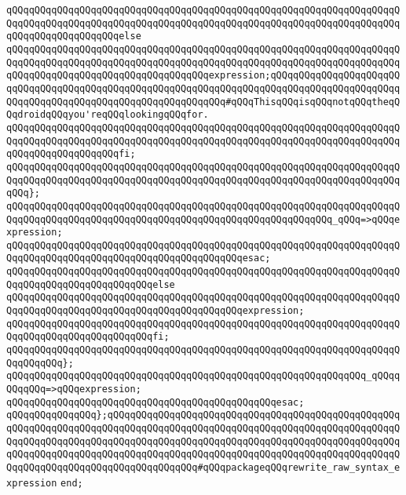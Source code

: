 \newline
\verb|qQQqqQQqqQQqqQQqqQQqqQQqqQQqqQQqqQQqqQQqqQQqqQQqqQQqqQQqqQQqqQQqqQQqqQQqqQQqqQQqqQQqqQQqqQQqqQQqqQQqqQQqqQQqqQQqqQQqqQQqqQQqqQQqqQQqqQQqqQQqqQQqqQQqqQQqqQQqqQQqelse|\newline
\verb|qQQqqQQqqQQqqQQqqQQqqQQqqQQqqQQqqQQqqQQqqQQqqQQqqQQqqQQqqQQqqQQqqQQqqQQqqQQqqQQqqQQqqQQqqQQqqQQqqQQqqQQqqQQqqQQqqQQqqQQqqQQqqQQqqQQqqQQqqQQqqQQqqQQqqQQqqQQqqQQqqQQqqQQqqQQqqQQqexpression;qQQqqQQqqQQqqQQqqQQqqQQqqQQqqQQqqQQqqQQqqQQqqQQqqQQqqQQqqQQqqQQqqQQqqQQqqQQqqQQqqQQqqQQqqQQqqQQqqQQqqQQqqQQqqQQqqQQqqQQqqQQqqQQqqQQq#qQQqThisqQQqisqQQqnotqQQqtheqQQqdroidqQQqyou'reqQQqlookingqQQqfor.|\newline
\verb|qQQqqQQqqQQqqQQqqQQqqQQqqQQqqQQqqQQqqQQqqQQqqQQqqQQqqQQqqQQqqQQqqQQqqQQqqQQqqQQqqQQqqQQqqQQqqQQqqQQqqQQqqQQqqQQqqQQqqQQqqQQqqQQqqQQqqQQqqQQqqQQqqQQqqQQqqQQqqQQqfi;|\newline
\verb|qQQqqQQqqQQqqQQqqQQqqQQqqQQqqQQqqQQqqQQqqQQqqQQqqQQqqQQqqQQqqQQqqQQqqQQqqQQqqQQqqQQqqQQqqQQqqQQqqQQqqQQqqQQqqQQqqQQqqQQqqQQqqQQqqQQqqQQqqQQqqQQq};|\newline
\newline
\verb|qQQqqQQqqQQqqQQqqQQqqQQqqQQqqQQqqQQqqQQqqQQqqQQqqQQqqQQqqQQqqQQqqQQqqQQqqQQqqQQqqQQqqQQqqQQqqQQqqQQqqQQqqQQqqQQqqQQqqQQqqQQqqQQq_qQQq=>qQQqexpression;|\newline
\verb|qQQqqQQqqQQqqQQqqQQqqQQqqQQqqQQqqQQqqQQqqQQqqQQqqQQqqQQqqQQqqQQqqQQqqQQqqQQqqQQqqQQqqQQqqQQqqQQqqQQqqQQqqQQqqQQqesac;|\newline
\verb|qQQqqQQqqQQqqQQqqQQqqQQqqQQqqQQqqQQqqQQqqQQqqQQqqQQqqQQqqQQqqQQqqQQqqQQqqQQqqQQqqQQqqQQqqQQqqQQqelse|\newline
\verb|qQQqqQQqqQQqqQQqqQQqqQQqqQQqqQQqqQQqqQQqqQQqqQQqqQQqqQQqqQQqqQQqqQQqqQQqqQQqqQQqqQQqqQQqqQQqqQQqqQQqqQQqqQQqqQQqexpression;|\newline
\verb|qQQqqQQqqQQqqQQqqQQqqQQqqQQqqQQqqQQqqQQqqQQqqQQqqQQqqQQqqQQqqQQqqQQqqQQqqQQqqQQqqQQqqQQqqQQqqQQqfi;|\newline
\verb|qQQqqQQqqQQqqQQqqQQqqQQqqQQqqQQqqQQqqQQqqQQqqQQqqQQqqQQqqQQqqQQqqQQqqQQqqQQqqQQq};|\newline
\newline
\verb|qQQqqQQqqQQqqQQqqQQqqQQqqQQqqQQqqQQqqQQqqQQqqQQqqQQqqQQqqQQqqQQq_qQQqqQQqqQQq=>qQQqexpression;|\newline
\verb|qQQqqQQqqQQqqQQqqQQqqQQqqQQqqQQqqQQqqQQqqQQqqQQqesac;|\newline
\verb|qQQqqQQqqQQqqQQq};qQQqqQQqqQQqqQQqqQQqqQQqqQQqqQQqqQQqqQQqqQQqqQQqqQQqqQQqqQQqqQQqqQQqqQQqqQQqqQQqqQQqqQQqqQQqqQQqqQQqqQQqqQQqqQQqqQQqqQQqqQQqqQQqqQQqqQQqqQQqqQQqqQQqqQQqqQQqqQQqqQQqqQQqqQQqqQQqqQQqqQQqqQQqqQQqqQQqqQQqqQQqqQQqqQQqqQQqqQQqqQQqqQQqqQQqqQQqqQQqqQQqqQQqqQQqqQQqqQQqqQQqqQQqqQQqqQQqqQQqqQQqqQQqqQQqqQQq#qQQqpackageqQQqrewrite_raw_syntax_expression|\newline
\verb|end;|\newline
\newline

